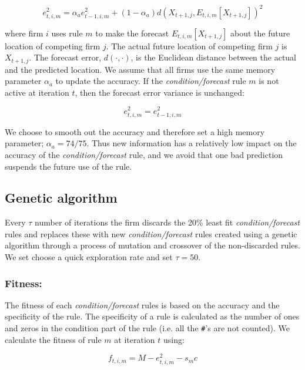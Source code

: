 \documentclass[preprint, 12pt]{elsarticle}
\begin{document}
\begin{equation}
e^2_{t,i,m} = \alpha_a e^2_{t-1,i,m} + (1-\alpha_a) d\left( X_{t+1,j}, E_{t,i,m} [X_{t+1,j}] \right)^2
\end{equation}

where firm $i$ uses rule $m$ to make the forecast $E_{t,i,m} [X_{t+1,j}]$ about the future location of competing firm $j$. The actual future location of competing firm $j$ is $X_{t+1,j}$. The forecast error, $d(\cdot,\cdot)$, is the Euclidean distance between the actual and the predicted location. We assume that all firms use the same memory parameter $\alpha_a$ to update the accuracy. If the \emph{condition/forecast} rule $m$ is not active at iteration $t$, then the forecast error variance is unchanged: 

$$e^2_{t,i,m} = e^2_{t-1,i,m}$$

We choose to smooth out the accuracy and therefore set a high memory parameter; $\alpha_a = 74/75$. Thus new information has a relatively low impact on the accuracy of the \emph{condition/forecast} rule, and we avoid that one bad prediction suspends the future use of the rule.

\subsection{Genetic algorithm}
\label{app:gadetails}

Every $\tau$ number of iterations the firm discards the 20\% least fit \emph{condition/forecast} rules and replaces these with new \emph{condition/forecast} rules created using a genetic algorithm through a process of mutation and crossover of the non-discarded rules. We set choose a quick exploration rate and set $\tau = 50$.

\subsubsection*{Fitness:}

The fitness of each \emph{condition/forecast} rules is based on the accuracy and the specificity of the rule. The specificity of a rule is calculated as the number of ones and zeros in the condition part of the rule (i.e. all the \texttt{\#}'s are not counted). We calculate the fitness of rule $m$ at iteration $t$ using:

\begin{equation}
f_{t,i,m} = M - e^2_{t,i,m} - s_m c
\end{equation}
\end{document}
